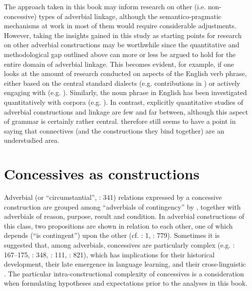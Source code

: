 The approach taken in this book may inform research on other (i.e. non-con\-ces\-sive) types of adverbial linkage, although the semantico-pragmatic mechanisms at work in most of them would require considerable adjustments. However, taking the insights gained in this study as starting points for research on other adverbial constructions may be worthwhile since the quantitative and methodological gap outlined above can more or less be argued to hold for the entire domain of adverbial linkage. This becomes evident, for example, if one looks at the amount of research conducted on aspects of the English verb phrase, either based on the central standard dialects (e.g. contributions in \citealt{AartsWallis2013}) or actively engaging with  (e.g. \citealt{HundtGut2012}). Similarly, the noun phrase in English has been investigated quantitatively with corpora (e.g. \citealt{Jucker1993,Pastor-Gómez2011,Berlage2014}). In contrast, explicitly quantitative studies of adverbial constructions and linkage are few and far between, although this aspect of grammar is certainly rather central. \citet[2]{Lenker2010} therefore still seems to have a point in saying that connectives (and the constructions they bind together) are an understudied area.

\section{\label{bkm:Ref411515113}\label{bkm:Ref411603806}Concessives as constructions}\label{sec:1.2}

Adverbial (or “circumstantial”, \citealt{KönigSiemund2000}: 341) relations expressed by a concessive construction are grouped among “adverbials of contingency” by \citet[479, 484]{QuirkEtAl1985}, together with adverbials of reason, purpose, result and condition. In adverbial constructions of this class, two propositions are shown in relation to each other, one of which depends (“is contingent”) upon the other (cf. \citealt{Burnham1911}: 1, \citealt{BiberEtAl1999}: 779). Sometimes it is suggested that, among adverbials, concessives are particularly complex (e.g. \citealt{Kortmann1996}: 167–175, \citealt{DiMeola1998}: 348, \citealt{Hoffmann2005}: 111, \citealt{König2006}: 821), which has implications for their historical development, their late emergence in language learning, and their cross-linguistic . The particular intra-constructional complexity of concessives is a consideration when formulating hypotheses and expectations prior to the analyses in this book.

